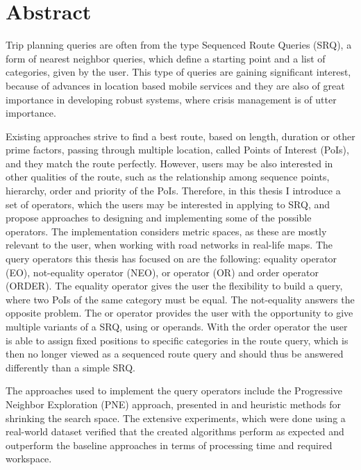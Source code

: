 \chapter{Abstract}
Trip planning queries are often from the type Sequenced Route Queries (SRQ), a form of nearest neighbor queries, which define a starting point and a list of categories, given by the user. This type of queries are gaining significant interest, because of advances in location based mobile services and they are also of great importance in developing robust systems, where crisis management is of utter importance. 

Existing approaches strive to find a best route, based on length, duration or other prime factors, passing through multiple location, called Points of Interest (PoIs), and they match the route perfectly. However, users may be also interested in other qualities of the route, such as the relationship among sequence points, hierarchy, order and priority of the PoIs. Therefore, in this thesis  I introduce a set of operators, which the users may be interested in applying to SRQ, and propose approaches to designing and implementing some of the possible operators. The implementation considers metric spaces, as these are mostly relevant to the user, when working with road networks in real-life maps.
The query operators this thesis has focused on are the following: equality operator (EO), not-equality operator (NEO), or operator (OR) and order operator (ORDER). The equality operator gives the user the flexibility to build a query, where two PoIs of the same category must be equal. The not-equality answers the opposite problem. The or operator provides the user with the opportunity to give multiple variants of a SRQ, using or operands. With the order operator the user is able to assign fixed positions to specific categories in the route query, which is then no longer viewed as a sequenced route query and should thus be answered differently than a simple SRQ.

The approaches used to implement the query operators include the Progressive Neighbor Exploration (PNE) approach, presented in \cite{OSR} and heuristic methods for shrinking the search space. The extensive experiments, which were done using a real-world dataset verified that the created algorithms perform as expected and outperform the baseline approaches in terms of processing time and required workspace.

\pagebreak
